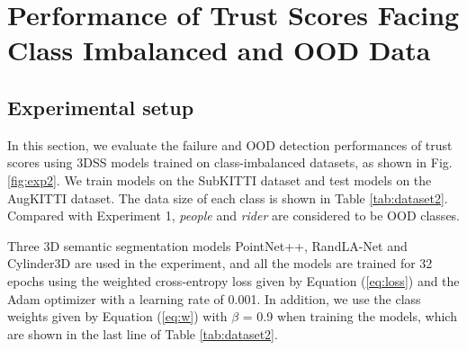 \documentclass[journal]{IEEEtran}
\begin{document}
\section{Performance of Trust Scores Facing Class Imbalanced and OOD Data} \label{sec:5}


\subsection{Experimental setup}


In this section, we evaluate the failure and OOD detection performances of trust scores using 3DSS models trained on class-imbalanced datasets, as shown in Fig. \ref{fig:exp2}. We train models on the SubKITTI dataset and test models on the AugKITTI dataset. The data size of each class is shown in Table \ref{tab:dataset2}. Compared with Experiment 1, \textit{people} and \textit{rider} are considered to be OOD classes.%

Three 3D semantic segmentation models PointNet++, RandLA-Net and Cylinder3D are used in the experiment, and all the models are trained for 32 epochs using the weighted cross-entropy loss given by Equation (\ref{eq:loss}) and the Adam optimizer with a learning rate of 0.001. In addition, we use the class weights given by Equation (\ref{eq:w}) with $\beta$ = 0.9 when training the models, which are shown in the last line of Table \ref{tab:dataset2}.
\end{document}
